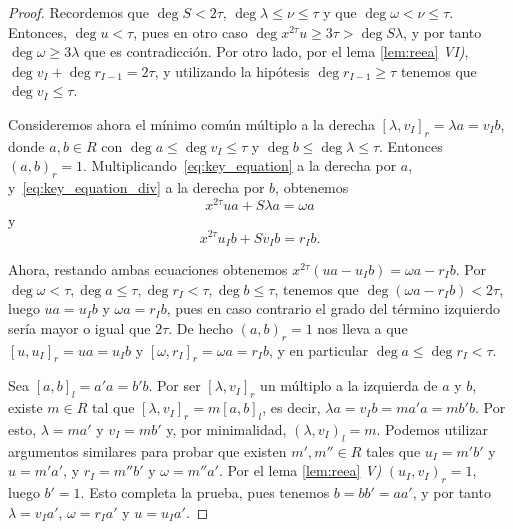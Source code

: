 \begin{proof}
    Recordemos que \(\deg S < 2\tau\), \(\deg \lambda \le \nu \le \tau\) y que \(\deg \omega < \nu \le \tau\). Entonces, \(\deg u < \tau\), pues en otro caso \(\deg x^{2\tau}u \ge 3\tau > \deg S\lambda\), y por tanto \(\deg \omega \ge 3\lambda\) que es contradicción. Por otro lado, por el lema \ref{lem:reea} \textit{VI)}, \(\deg v_{I} + \deg r_{I-1} = 2\tau\), y utilizando la hipótesis \(\deg r_{I-1} \ge \tau\) tenemos que \(\deg v_{I} \le \tau\).

    Consideremos ahora el mínimo común múltiplo a la derecha \({[\lambda, v_{I}]}_{r} = \lambda a = v_{I}b\), donde \(a, b \in R\) con \(\deg a \le \deg v_{I} \le \tau\) y \(\deg b \le \deg \lambda \le \tau\). Entonces  \({(a,b)}_{r} = 1\). Multiplicando~\eqref{eq:key_equation} a la derecha por \(a\), y~\eqref{eq:key_equation_div} a la derecha por \(b\), obtenemos
    \begin{equation}
        x^{2\tau} u a + S \lambda a = \omega a
    \end{equation}
y
    \begin{equation}
        x^{2\tau}u_{I}b + Sv_{I}b = r_{I}b.
    \end{equation}

    Ahora, restando ambas ecuaciones obtenemos \(x^{2\tau}(ua - u_{I}b) = \omega a - r_{I}b\). Por \(\deg \omega < \tau, \deg a \le \tau, \deg r_{I} < \tau, \deg{b} \le \tau\), tenemos que \(\deg (\omega a - r_{I}b) < 2\tau\), luego \(ua = u_{I}b\) y \(\omega a = r_{I}b\), pues en caso contrario el grado del término izquierdo sería mayor o igual que \(2\tau\). De hecho \({(a,b)}_{r} = 1\) nos lleva a que \({[u, u_{I}]}_r = ua = u_{I}b\) y \({[\omega, r_{I}]}_r = \omega a = r_{I}b\), y en particular \(\deg a \le \deg r_{I} < \tau\).

    Sea \({[a,b]}_l = a'a = b'b\). Por ser \([\lambda, v_{I}]_r\) un múltiplo a la izquierda de \(a\) y \(b\), existe \(m \in R\) tal que \({[\lambda, v_{I}]}_{r} = m{[a,b]}_{l}\), es decir, \(\lambda a = v_{I}b = ma'a = mb'b\). Por esto, \(\lambda = ma'\) y \(v_{I} = mb'\) y, por minimalidad, \({(\lambda, v_{I})}_l = m\). Podemos utilizar argumentos similares para probar que existen \(m', m'' \in R\) tales que \(u_{I} = m'b'\) y  \(u = m'a'\), y  \(r_{I} = m''b'\) y \(\omega = m''a'\). Por el lema \ref{lem:reea} \textit{V)} \({(u_{I}, v_{I})} _r = 1\), luego \(b' = 1\). Esto completa la prueba, pues tenemos \(b = b b' = a a'\), y por tanto  \(\lambda = v_{I}a'\), \(\omega = r_{I}a'\) y \(u = u_{I}a'\).
\end{proof}

